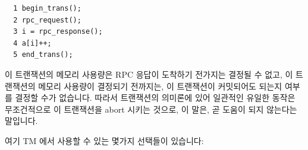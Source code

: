 \vspace{5pt}
\begin{minipage}[t]{\columnwidth}
\small
\begin{verbatim}
  1 begin_trans();
  2 rpc_request();
  3 i = rpc_response();
  4 a[i]++;
  5 end_trans();
\end{verbatim}
\end{minipage}
\vspace{5pt}

이 트랜잭션의 메모리 사용량은 RPC 응답이 도착하기 전가지는 결정될 수 없고, 이
트랜잭션의 메모리 사용량이 결정되기 전까지는, 이 트랜잭션이 커밋되어도 되는지
여부를 결정할 수가 없습니다.
따라서 트랜잭션의 의미론에 있어 일관적인 유일한 동작은 무조건적으로 이
트랜잭션을 abort 시키는 것으로, 이 말은, 곧 도움이 되지 않는다는 말입니다.

여기 TM 에서 사용할 수 있는 몇가지 선택들이 있습니다:

